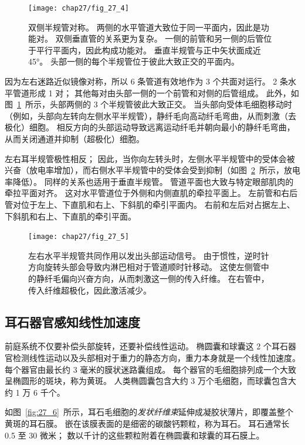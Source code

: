 \begin{figure}[htbp]
	\centering
	\texttt{[image: chap27/fig\_27\_4]}
	\caption{双侧半规管对称。
		两侧的水平管道大致位于同一平面内，因此是功能对。
		双侧垂直管的关系更为复杂。
		一侧的前管和另一侧的后管位于平行平面内，因此构成功能对。
		垂直半规管与正中矢状面成近 45°。
		头部一侧的每个半规管位于彼此大致正交的平面内。}
	\label{fig:27_4}
\end{figure}


因为左右迷路近似镜像对称，所以 6 条管道有效地作为 3 个共面对运行。
2 条水平管道形成 1 对；
其他每对由头部一侧的一个前管和对侧的后管组成。
此外，如图~\ref{fig:27_4}~所示，头部两侧的 3 个半规管彼此大致正交。
当头部向受体毛细胞移动时（例如，头部向左转向左侧水平半规管），静纤毛向高动纤毛弯曲，从而刺激（去极化）细胞。
相反方向的头部运动导致远离运动纤毛并朝向最小的静纤毛弯曲，从而关闭通道并抑制（超极化）细胞。


左右耳半规管极性相反；
因此，当你向左转头时，左侧水平半规管中的受体会被兴奋（放电率增加），而右侧水平半规管中的受体会受到抑制（如图~\ref{fig:27_5}~所示，放电率降低）。
同样的关系也适用于垂直半规管。
管道平面也大致与特定眼部肌肉的牵拉平面对齐。
这对水平管道位于外侧和内侧直肌的牵拉平面上。
左前管和右后管对位于左上、下直肌和右上、下斜肌的牵引平面内。
右前和左后对占据左上、下斜肌和右上、下直肌的牵引平面。


\begin{figure}[htbp]
	\centering
	\texttt{[image: chap27/fig\_27\_5]}
	\caption{左右水平半规管共同作用以发出头部运动信号。
		由于惯性，逆时针方向旋转头部会导致内淋巴相对于管道顺时针移动。
		这使左侧管中的静纤毛偏向兴奋方向，从而刺激这一侧的传入纤维。
		在右管中，传入纤维超极化，因此激活减少。}
	\label{fig:27_5}
\end{figure}



\subsection{耳石器官感知线性加速度}

前庭系统不仅要补偿头部旋转，还要补偿线性运动。
椭圆囊和球囊这 2 个耳石器官检测线性运动以及头部相对于重力的静态方向，重力本身就是一个线性加速度。
每个器官由最长约 3 毫米的膜状迷路囊组成。
每个器官的毛细胞排列成一个大致呈椭圆形的斑块，称为黄斑。
人类椭圆囊包含大约 3 万个毛细胞，而球囊包含大约 1 万 6 千个。


如图~\ref{fig:27_6}~所示，耳石毛细胞的\textit{发状纤维束}延伸成凝胶状薄片，即覆盖整个黄斑的耳石膜。
嵌在该膜表面的是细密的碳酸钙颗粒，称为耳石。
耳石通常长 0.5 至 30 微米；
数以千计的这些颗粒附着在椭圆囊和球囊的耳石膜上。


